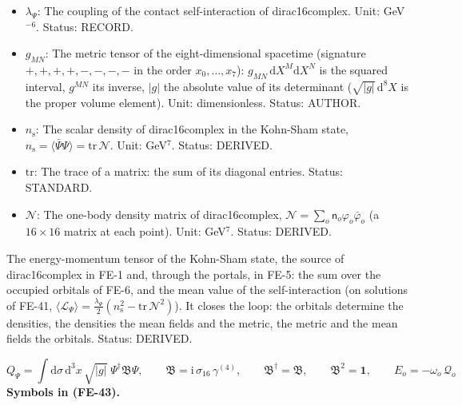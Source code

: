 \documentclass[
  10pt,
]{article}
\begin{document}
\begin{itemize}
  for \(SU(2)\) with \(g_2\epsilon^{IJK}\)). Unit: 1/length. Status:
  STANDARD.
\item
  \(\lambda_\Psi\): The coupling of the contact self-interaction of
  dirac16complex. Unit: GeV\(^{-6}\). Status: RECORD.
\item
  \(g_{MN}\): The metric tensor of the eight-dimensional spacetime
  (signature \(+,+,+,+,-,-,-,-\) in the order \(x_0, \dots, x_7\)):
  \(g_{MN}\,\mathrm{d}X^M\mathrm{d}X^N\) is the squared interval,
  \(g^{MN}\) its inverse, \(\lvert g\rvert\) the absolute value of its
  determinant (\(\sqrt{\lvert g\rvert}\,\mathrm{d}^8X\) is the proper
  volume element). Unit: dimensionless. Status: AUTHOR.
\item
  \(n_{\mathrm{s}}\): The scalar density of dirac16complex in the
  Kohn-Sham state,
  \(n_{\mathrm{s}} = \langle\bar\Psi\Psi\rangle = \mathrm{tr}\,\mathcal{N}\).
  Unit: GeV\(^7\). Status: DERIVED.
\item
  \(\mathrm{tr}\): The trace of a matrix: the sum of its diagonal
  entries. Status: STANDARD.
\item
  \(\mathcal{N}\): The one-body density matrix of dirac16complex,
  \(\mathcal{N} = \sum_o\mathsf{n}_o\varphi_o\bar\varphi_o\) (a
  \(16 \times 16\) matrix at each point). Unit: GeV\(^7\). Status:
  DERIVED.
\end{itemize}

The energy-momentum tensor of the Kohn-Sham state, the source of
dirac16complex in FE-1 and, through the portals, in FE-5: the sum over
the occupied orbitals of FE-6, and the mean value of the
self-interaction (on solutions of FE-41,
\(\langle\mathcal{L}_\Psi\rangle = \frac{\lambda_\Psi}{2}(n_{\mathrm{s}}^2 - \mathrm{tr}\,\mathcal{N}^2)\)).
It closes the loop: the orbitals determine the densities, the densities
the mean fields and the metric, the metric and the mean fields the
orbitals. Status: DERIVED.

\[
Q_\Psi = \int\mathrm{d}\sigma\,\mathrm{d}^3x\,\sqrt{\lvert g\rvert}\;\Psi^\dagger\mathfrak{B}\Psi,\qquad
\mathfrak{B} = \mathrm{i}\,\sigma_{16}\,\gamma^{(4)},\qquad \mathfrak{B}^\dagger = \mathfrak{B},\qquad \mathfrak{B}^2 = \mathbf{1},\qquad
E_o = -\omega_o\,\mathcal{Q}_o \tag{FE-43}
\] \textbf{Symbols in (FE-43).}
\end{document}

